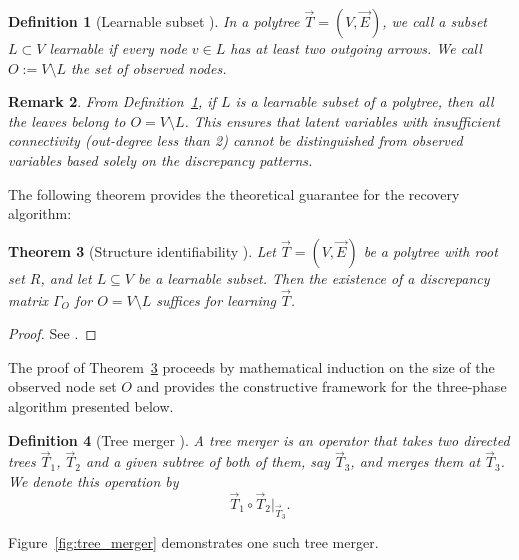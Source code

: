 \documentclass[11pt,a4paper]{article}
\numberwithin{equation}{section}
\newtheorem{theorem}{Theorem}[section]
\newtheorem{definition}[theorem]{Definition}
\newtheorem{remark}[theorem]{Remark}
\begin{document}
\begin{definition}[Learnable subset {\citealp[Def.~8]{etesami:kiyavash:coleman:2016}}]
\label{def:learnable_subset}
In a polytree $\vec{T} = (V, \vec{E})$, we call a subset $L \subset V$ \emph{learnable} if every node $v \in L$ has at least two outgoing arrows. We call $O := V \setminus L$ the set of observed nodes.
\end{definition}

\begin{remark}
From Definition~\ref{def:learnable_subset}, if $L$ is a learnable subset of a polytree, then all the leaves belong to $O = V \setminus L$. This ensures that latent variables with insufficient connectivity (out-degree less than 2) cannot be distinguished from observed variables based solely on the discrepancy patterns.
\end{remark}

The following theorem provides the theoretical guarantee for the recovery algorithm:

\begin{theorem}[Structure identifiability {\citealp[Thm.~4]{etesami:kiyavash:coleman:2016}}]
\label{thm:identifiability}
Let $\vec{T} = (V, \vec{E})$ be a polytree with root set $R$, and let $L \subseteq V$ be a learnable subset. Then the existence of a discrepancy matrix $\Gamma_O$ for $O = V \setminus L$ suffices for learning $\vec{T}$.
\end{theorem}

\begin{proof}
See \citet[Appendix H]{etesami:kiyavash:coleman:2016}.
\end{proof}

The proof of Theorem~\ref{thm:identifiability} proceeds by mathematical induction on the size of the observed node set $O$ and provides the constructive framework for the three-phase algorithm presented below.

\begin{definition}[Tree merger {\citealp[Def.~9]{etesami:kiyavash:coleman:2016}}]
\label{def:tree_merger}
A \emph{tree merger} is an operator that takes two directed trees $\vec{T}_1$, $\vec{T}_2$ and a given subtree of both of them, say $\vec{T}_3$, and merges them at $\vec{T}_3$. We denote this operation by
\[
\vec{T}_1 \circ \vec{T}_2 \big|_{\vec{T}_3}.
\]
\end{definition}
Figure~\ref{fig:tree_merger} demonstrates one such tree merger.
\end{document}
